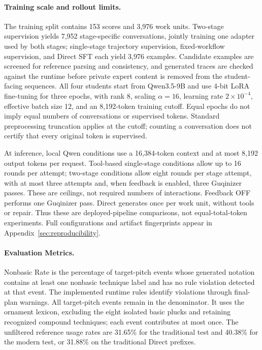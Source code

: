 \paragraph{Training scale and rollout limits.}
The training split contains 153 scores and 3,976 work units. Two-stage supervision yields 7,952 stage-specific conversations, jointly training one adapter used by both stages; single-stage trajectory supervision, fixed-workflow supervision, and Direct SFT each yield 3,976 examples. Candidate examples are screened for reference parsing and consistency, and generated traces are checked against the runtime before private expert content is removed from the student-facing sequences. All four students start from Qwen3.5-9B and use 4-bit LoRA fine-tuning for three epochs, with rank 8, scaling $\alpha=16$, learning rate $2\times10^{-4}$, effective batch size 12, and an 8,192-token training cutoff. Equal epochs do not imply equal numbers of conversations or supervised tokens. Standard preprocessing truncation applies at the cutoff; counting a conversation does not certify that every original token is supervised.

At inference, local Qwen conditions use a 16,384-token context and at most 8,192 output tokens per request. Tool-based single-stage conditions allow up to 16 rounds per attempt; two-stage conditions allow eight rounds per stage attempt, with at most three attempts and, when feedback is enabled, three Guqinizer passes. These are ceilings, not required numbers of interactions. Feedback OFF performs one Guqinizer pass. Direct generates once per work unit, without tools or repair. Thus these are deployed-pipeline comparisons, not equal-total-token experiments. Full configurations and artifact fingerprints appear in Appendix~\ref{sec:reproducibility}.

\paragraph{Evaluation Metrics.}
Nonbasic Rate is the percentage of target-pitch events whose generated notation contains at least one nonbasic technique label and has no rule violation detected at that event. The implemented runtime rules identify violations through final-plan warnings. All target-pitch events remain in the denominator. It uses the ornament lexicon, excluding the eight isolated basic plucks and retaining recognized compound techniques; each event contributes at most once. The unfiltered reference usage rates are 31.65\% for the traditional test and 40.38\% for the modern test, or 31.88\% on the traditional Direct prefixes.

